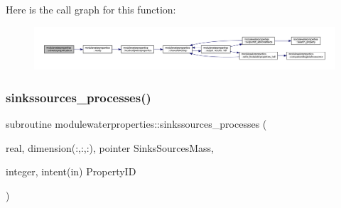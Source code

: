 Here is the call graph for this function\+:\nopagebreak
\begin{figure}[H]
\begin{center}
\leavevmode
\includegraphics[width=350pt]{namespacemodulewaterproperties_abc01d8d69bf69056b5ad8b7fc0ebb668_cgraph}
\end{center}
\end{figure}
\mbox{\label{namespacemodulewaterproperties_a10d63582cfbe1d7e4a4c18ad2b27ffc5}} 
\subsubsection{\texorpdfstring{sinkssources\+\_\+processes()}{sinkssources\_processes()}}
{\footnotesize\ttfamily subroutine modulewaterproperties\+::sinkssources\+\_\+processes (\begin{DoxyParamCaption}\item[{real, dimension(\+:,\+:,\+:), pointer}]{Sinks\+Sources\+Mass,  }\item[{integer, intent(in)}]{Property\+ID }\end{DoxyParamCaption})\hspace{0.3cm}{\ttfamily [private]}}

